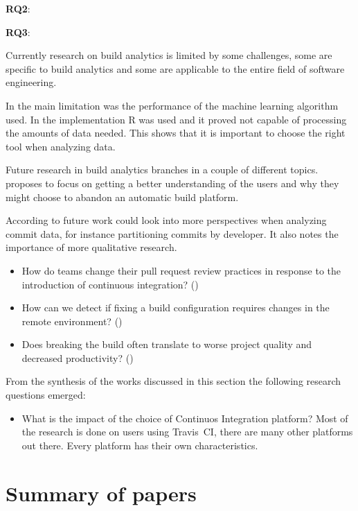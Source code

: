 \documentclass[]{book}
\providecommand{\tightlist}{%
  \setlength{\itemsep}{0pt}\setlength{\parskip}{0pt}}
\begin{document}
\textbf{RQ2}:

\textbf{RQ3}:

Currently research on build analytics is limited by some challenges,
some are specific to build analytics and some are applicable to the
entire field of software engineering.

In \citet{bisong2017built} the main limitation was the performance of
the machine learning algorithm used. In the implementation R was used
and it proved not capable of processing the amounts of data needed. This
shows that it is important to choose the right tool when analyzing data.

Future research in build analytics branches in a couple of different
topics. \citet{pinto2018work} proposes to focus on getting a better
understanding of the users and why they might choose to abandon an
automatic build platform.

According to \citet{baltes2018no} future work could look into more
perspectives when analyzing commit data, for instance partitioning
commits by developer. It also notes the importance of more qualitative
research.

\begin{itemize}
\tightlist
\item
  How do teams change their pull request review practices in response to
  the introduction of continuous integration? (\citet{zhao2017impact})
\item
  How can we detect if fixing a build configuration requires changes in
  the remote environment? (\citet{vassallo2018break})
\item
  Does breaking the build often translate to worse project quality and
  decreased productivity? (\citet{beller2017oops})
\end{itemize}

From the synthesis of the works discussed in this section the following
research questions emerged:

\begin{itemize}
\tightlist
\item
  What is the impact of the choice of Continuos Integration platform?
  Most of the research is done on users using Travis~CI, there are many
  other platforms out there. Every platform has their own
  characteristics.
\end{itemize}

\section{Summary of papers}\label{summary-of-papers}
\end{document}
